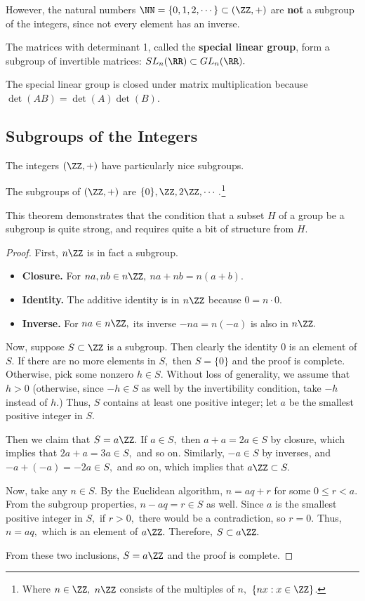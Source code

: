 However, the natural numbers $\NN = \{0, 1, 2, \cdots \} \subset (\ZZ, +)$ are \textbf{not} a subgroup of the integers, since not every element has an inverse.

\begin{example}
The matrices with determinant 1, called the \textbf{special linear group}, form a subgroup of invertible matrices: $SL_n(\RR) \subset GL_n(\RR).$
\end{example}
The special linear group is closed under matrix multiplication because $\det(AB) = \det(A)\det(B).$ 

\subsection{Subgroups of the Integers}
The integers $(\ZZ, +)$ have particularly nice subgroups. 
\begin{theorem}\label{subgroup of z}
The subgroups of $(\ZZ, +)$ are $\{0\}, \ZZ, 2\ZZ, \cdots.$\footnote{Where $n \in \ZZ,$ $n\ZZ$ consists of the multiples of $n,$ $\{nx: x \in \ZZ\}$.}
\end{theorem}

This theorem demonstrates that the condition that a subset $H$ of a group be a subgroup is quite strong, and requires quite a bit of structure from $H.$

\begin{proof}
First, $n\ZZ$ is in fact a subgroup.
\begin{itemize}
    \item \textbf{Closure.} For $na, nb \in n\ZZ,$ $na + nb = n(a + b).$
    \item \textbf{Identity.} The additive identity is in $n\ZZ$ because $0 = n \cdot 0.$
    
    \item \textbf{Inverse.} For $na \in n\ZZ,$ its inverse $-na = n(-a)$ is also in $n\ZZ.$
\end{itemize}

Now, suppose $S \subset \ZZ$ is a subgroup. Then clearly the identity $0$ is an element of $S.$ If there are no more elements in $S,$ then $S = \{0\}$ and the proof is complete. Otherwise, pick some nonzero $h \in S.$ Without loss of generality, we assume that $h > 0$ (otherwise, since $-h \in S$ as well by the invertibility condition, take $-h$ instead of $h.$) Thus, $S$ contains at least one positive integer; let $a$ be the smallest positive integer in $S.$ 

Then we claim that $S = a\ZZ.$ If $a \in S,$ then $a + a = 2a \in S$ by closure, which implies that $2a + a = 3a \in S,$ and so on. Similarly, $-a \in S$ by inverses, and $-a + (-a) = -2a \in S,$ and so on, which implies that $a \ZZ \subset S.$ 

Now, take any $n \in S.$ By the Euclidean algorithm, $n = aq + r$ for some $0 \leq r < a.$ From the subgroup properties, $n - aq  = r\in S$ as well. Since $a$ is the smallest positive integer in $S,$ if $r > 0,$ there would be a contradiction, so $r = 0.$ Thus, $n = aq,$ which is an element of $a\ZZ.$ Therefore, $S \subset a\ZZ.$ 

From these two inclusions, $S = a\ZZ$ and the proof is complete.
\end{proof}

